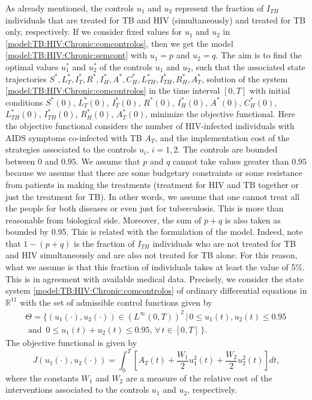 \documentclass{my_aims}
\theoremstyle{definition}
\begin{document}
As already mentioned, the controls $u_1$ and $u_2$ represent the fraction of $I_{TH}$ individuals that are treated
for TB and HIV (simultaneously) and treated for TB only, respectively. If we consider fixed values
for $u_1$ and $u_2$ in \eqref{model:TB:HIV:Chronic:comcontrolos}, then we get the model
\eqref{model:TB:HIV:Chronic:semcont} with $u_1 = p$ and $u_2 = q$.
The aim is to find the optimal values $u_1^*$ and $u_2^*$ of the controls
$u_1$ and $u_2$, such that the associated state trajectories
$S^*, L_T^*, I_T^*, R^*, I_H^*, A^*, C_H^*, L_{TH}^*, I_{TH}^*, R_H^*, A_T^*$,
solution of the system \eqref{model:TB:HIV:Chronic:comcontrolos}
in the time interval $[0, T]$ with initial conditions
$S^*(0)$, $L_T^*(0)$, $I_T^*(0)$, $R^*(0)$, $I_H^*(0)$,
$A^*(0)$, $C_H^*(0)$, $L_{TH}^*(0)$, $I_{TH}^*(0)$, $R_H^*(0)$, $A_T^*(0)$,
minimize the objective functional.
Here the objective functional considers the number of HIV-infected individuals
with AIDS symptoms co-infected with TB $A_T$, and the implementation cost
of the strategies associated to the controls $u_i$, $i=1, 2$.
The controls are bounded between $0$ and $0.95$.
We assume that $p$ and $q$ cannot take values greater than $0.95$
because we assume that there are some budgetary constraints or some resistance
from patients in making the treatments (treatment for HIV and TB together or just the treatment for TB).
In other words, we assume that one cannot treat all the people for both diseases
or even just for tuberculosis. This is more than reasonable from biological side.
Moreover, the sum of $p + q$ is also taken as bounded by 0.95. This is related with the formulation of the model.
Indeed, note that $1- (p + q)$ is the fraction of $I_{TH}$ individuals who are not treated for TB and HIV simultaneously
and are also not treated for TB alone. For this reason, what we assume is that this fraction of individuals
takes at least the value of 5\%. This is in agreement with available medical data.
Precisely, we consider the state system \eqref{model:TB:HIV:Chronic:comcontrolos}
of ordinary differential equations in $\mathbb{R}^{11}$
with the set of admissible control functions given by
\begin{multline}
\label{eq:adm:controls}
\Theta = \biggl\{ (u_1(\cdot), u_2(\cdot)) \in (L^{\infty}(0, T))^2 \,
| \,  0 \leq u_1 (t), u_2(t) \leq 0.95 \, \\
\text{ and } \, 0 \leq u_1 (t)
+ u_2(t) \leq 0.95 ,  \, \forall \, t \in [0, T] \, \biggr\} .
\end{multline}
The objective functional is given by
\begin{equation}
\label{costfunction}
J(u_1(\cdot), u_2(\cdot)) = \int_0^{T} \left[ A_T(t)
+ \frac{W_1}{2}u_1^2(t) + \frac{W_2}{2}u_2^2(t) \right] dt,
\end{equation}
where the constants $W_1$ and $W_2$ are a measure
of the relative cost of the interventions
associated to the controls $u_1$ and $u_2$, respectively.
\end{document}
